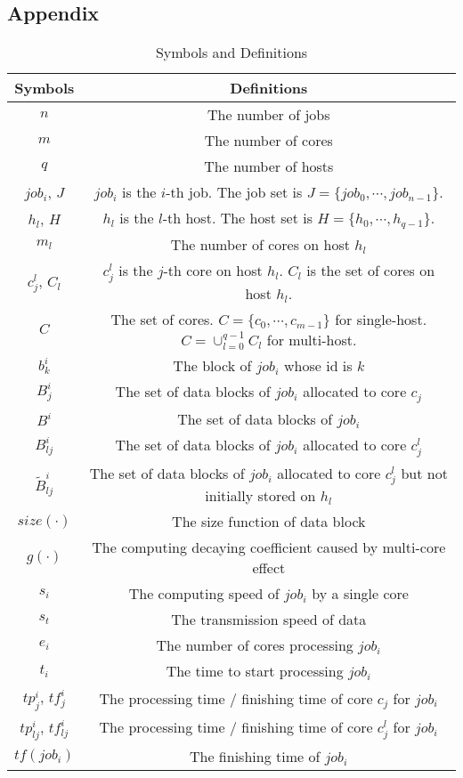 \documentclass{llncs}
\begin{document}
\begin{appendices}
\section*{Appendix}

\begin{table}[htbp]
\caption{Symbols and Definitions}
\begin{center}
\begin{tabular}{c|c}
\toprule
\textbf{Symbols} &\textbf{Definitions}  \\
\midrule
$n$ & The number of jobs  \\
$m$ & The number of cores \\
$q$ & The number of hosts  \\
$job_i$, $J$ & $job_i$ is the $i$-th job. The job set is $J=\{job_0, \cdots, job_{n-1}\}$. \\
$h_l$, $H$ & $h_l$ is the $l$-th  host. The host set is $H=\{h_0, \cdots, h_{q-1}\}$. \\
$m_l$ & The number of cores on host $h_l$\\
$c^l_j$, $C_l$ & $c^l_j$ is the $j$-th core on host $h_l$. $C_l$ is the set of cores on host $h_l$.\\
$C$ & The set of cores. $C=\{c_0,\cdots,c_{m-1}\}$ for single-host. $C=\cup_{l=0}^{q-1} C_l$ for multi-host.\\
$b^i_k$& The block of $job_i$ whose id is $k$\\
$B^i_{j}$ & The set of data blocks of $job_i$ allocated to core $c_j$ \\
$B^i$ & The set of data blocks of $job_i$ \\
$B^i_{lj}$ & The set of data blocks of $job_i$ allocated to core $c^l_j$ \\
$\widetilde{B}^i_{lj}$ & The set of data blocks of $job_i$ allocated to core $c^l_j$ but not initially stored on $h_l$\\
$size(\cdot)$ & The size function of data block\\
$g(\cdot)$ &  The computing decaying coefficient caused by multi-core effect\\
$s_i$ & The computing speed of $job_i$ by a single core\\
$s_t$ & The transmission speed of data \\
$e_i$ & The number of cores processing $job_i$\\
$t_i$ & The time to start processing $job_i$\\
$tp^i_j$, $tf^i_{j}$ & The processing time / finishing time of core $c_j$ for $job_i$\\
$tp^i_{lj}$, $tf^i_{lj}$ & The processing time / finishing time of core $c^l_j$ for $job_i$\\
$tf(job_i)$ & The finishing time of $job_i$ \\


\end{tabular}
\end{center}
\end{table}
\end{appendices}
\end{document}
